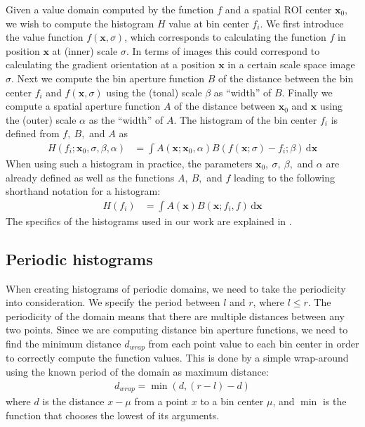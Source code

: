 \documentclass[thesis.tex]{subfiles}
\def\x{\mathbf{x}}
\begin{document}
Given a value domain computed by the function $f$ and a spatial ROI center $\x_0$, we wish to compute the histogram $H$ value at bin center $f_i$.
We first introduce the value function $f(\x,\sigma)$, which corresponds to calculating the function $f$ in position $\x$ at (inner) scale $\sigma$. In terms of images this could correspond to calculating the gradient orientation at a position $\x$ in a certain scale space image $\sigma$.
Next we compute the bin aperture function $B$ of the distance between the bin center $f_i$ and $f(\x,\sigma)$ using the (tonal) scale $\beta$ as ``width'' of $B$. Finally we compute a spatial aperture function $A$ of the distance between $\x_0$ and $\x$ using the (outer) scale $\alpha$ as the ``width'' of $A$. The histogram of the bin center $f_i$ is defined from $f,~B,$ and $A$ as
%
\begin{align}
	\label{eq:histogramLong}
	H(f_i;\x_0,\sigma,\beta,\alpha) &= \int A(\x;\x_0,\alpha) B(f(\x;\sigma)-f_i;\beta)\,\text{d}\x
\end{align}
%
When using such a histogram in practice, the parameters $\x_0,~\sigma,~\beta,$ and $\alpha$ are already defined as well as the functions $A,~B,$ and $f$ leading to the following shorthand notation for a histogram:
%
\begin{align}
	\label{eq:histogramShort}
	H(f_i) &= \int A(\x) B(\x;f_i,f)\,\text{d}\x
\end{align}
%
The specifics of the histograms used in our work are explained in .
%
\subsection{Periodic histograms}
When creating histograms of periodic domains, we need to take the periodicity into consideration. We specify the period between $l$ and $r$, where $l \leq r$.
The periodicity of the domain means that there are multiple distances between any two points. Since we are computing distance bin aperture functions, we need to find the minimum distance $d_{wrap}$ from each point value to each bin center in order to correctly compute the function values. This is done by a simple wrap-around using the known period of the domain as maximum distance:
\begin{align*}
	d_{wrap} = \min(d,(r - l)-d)
\end{align*}
where $d$ is the distance $x - \mu$ from a point $x$ to a bin center $\mu$, and $\min$ is the function that chooses the lowest of its arguments.
\end{document}
